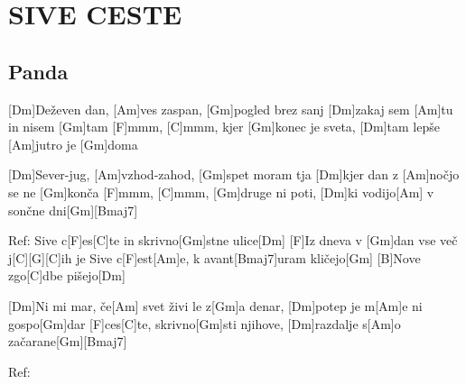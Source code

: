 \documentclass{article}
\begin{document}
\section*{SIVE CESTE}
%
\subsection*{Panda}
\begin{guitar}

[Dm]Deževen dan, [Am]ves zaspan, [Gm]pogled brez sanj
[Dm]zakaj sem [Am]tu in nisem [Gm]tam
[F]mmm, [C]mmm, kjer [Gm]konec je sveta, [Dm]tam lepše [Am]jutro je [Gm]doma
\linebreak

[Dm]Sever-jug, [Am]vzhod-zahod, [Gm]spet moram tja
[Dm]kjer dan z [Am]nočjo se ne [Gm]konča
[F]mmm, [C]mmm, [Gm]druge ni poti, [Dm]ki vodijo[Am] v sončne dni[Gm][Bmaj7]
\linebreak

Ref:
Sive c[F]es[C]te in skrivno[Gm]stne ulice[Dm]
[F]Iz dneva v [Gm]dan vse več j[C][G][C]ih je
Sive c[F]est[Am]e, k avant[Bmaj7]uram kličejo[Gm]
[B]Nove zgo[C]dbe pišejo[Dm]
\linebreak

[Dm]Ni mi mar, če[Am] svet živi le z[Gm]a denar,
[Dm]potep je m[Am]e ni gospo[Gm]dar
[F]ces[C]te, skrivno[Gm]sti njihove, [Dm]razdalje s[Am]o začarane[Gm][Bmaj7]
\linebreak

Ref:
\end{guitar}
\end{document}
